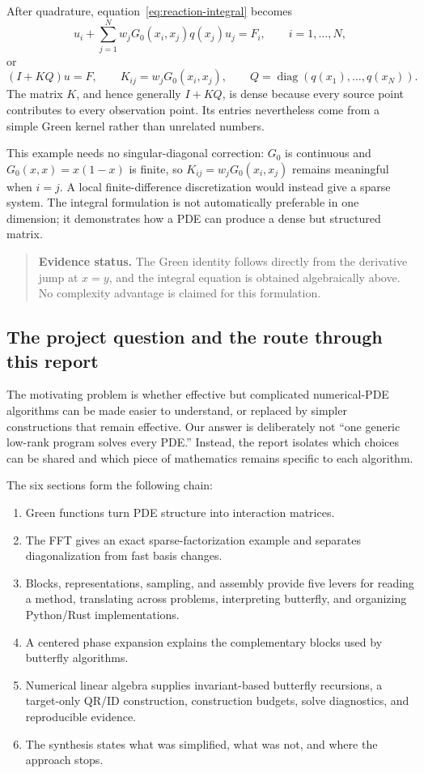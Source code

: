 \documentclass[11pt,a4paper]{article}
\newenvironment{evidence}{\begin{quote}\small\color{muted}\textbf{Evidence status.} }{\end{quote}}
\begin{document}
After quadrature, equation~\eqref{eq:reaction-integral} becomes
\begin{equation}
    u_i+\sum_{j=1}^{N}w_jG_0(x_i,x_j)q(x_j)u_j=F_i,
    \qquad i=1,\ldots,N,
    \label{eq:reaction-discrete-sum}
\end{equation}
or
\begin{equation}
    (I+KQ)u=F,
    \qquad K_{ij}=w_jG_0(x_i,x_j),
    \qquad Q=\operatorname{diag}(q(x_1),\ldots,q(x_N)).
    \label{eq:reaction-system}
\end{equation}
The matrix $K$, and hence generally $I+KQ$, is dense because every source point contributes to every observation point. Its entries nevertheless come from a simple Green kernel rather than unrelated numbers.

This example needs no singular-diagonal correction: $G_0$ is continuous and $G_0(x,x)=x(1-x)$ is finite, so $K_{ij}=w_jG_0(x_i,x_j)$ remains meaningful when $i=j$. A local finite-difference discretization would instead give a sparse system. The integral formulation is not automatically preferable in one dimension; it demonstrates how a PDE can produce a dense but structured matrix.
\begin{evidence}
The Green identity follows directly from the derivative jump at $x=y$, and the integral equation is obtained algebraically above. No complexity advantage is claimed for this formulation.
\end{evidence}

\subsection{The project question and the route through this report}
The motivating problem is whether effective but complicated numerical-PDE algorithms can be made easier to understand, or replaced by simpler constructions that remain effective. Our answer is deliberately not ``one generic low-rank program solves every PDE.'' Instead, the report isolates which choices can be shared and which piece of mathematics remains specific to each algorithm.

The six sections form the following chain:
\begin{enumerate}
\item Green functions turn PDE structure into interaction matrices.
\item The FFT gives an exact sparse-factorization example and separates diagonalization from fast basis changes.
\item Blocks, representations, sampling, and assembly provide five levers for reading a method, translating across problems, interpreting butterfly, and organizing Python/Rust implementations.
\item A centered phase expansion explains the complementary blocks used by butterfly algorithms.
\item Numerical linear algebra supplies invariant-based butterfly recursions, a target-only QR/ID construction, construction budgets, solve diagnostics, and reproducible evidence.
\item The synthesis states what was simplified, what was not, and where the approach stops.
\end{enumerate}
\end{document}
